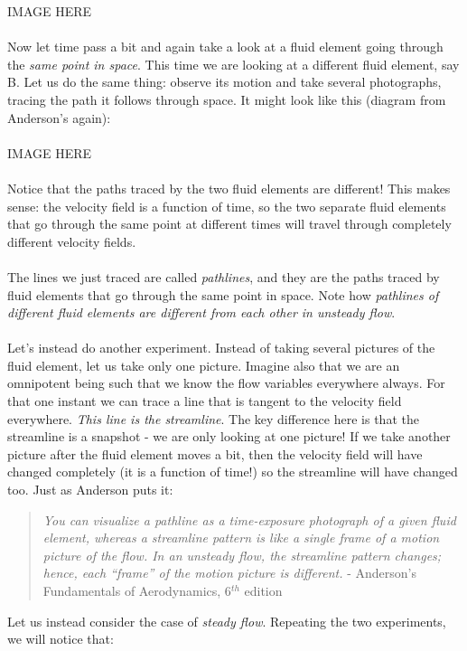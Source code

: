 \documentclass[11pt]{article}
\begin{document}
IMAGE HERE \\ \\ 
\noindent
Now let time pass a bit and again take a look at a fluid element going through the \emph{same point in space}. This time we are looking at a different fluid element, say B. Let us do the same thing: observe its motion and take several photographs, tracing the path it follows through space. It might look like this (diagram from Anderson's again): \\ \\

IMAGE HERE \\ \\
\noindent
Notice that the paths traced by the two fluid elements are different! This makes sense: the velocity field is a function of time, so the two separate fluid elements that go through the same point at different times will travel through completely different velocity fields. \\ \\
\noindent
The lines we just traced are called \emph{pathlines}, and they are the paths traced by fluid elements that go through the same point in space. Note how \emph{pathlines of different fluid elements are different from each other in unsteady flow}.\\ \\
\noindent
Let's instead do another experiment. Instead of taking several pictures of the fluid element, let us take only one picture. Imagine also that we are an omnipotent being such that we know the flow variables everywhere always. For that one instant we can trace a line that is tangent to the velocity field everywhere. \emph{This line is the streamline}. The key difference here is that the streamline is a snapshot - we are only looking at one picture! If we take another picture after the fluid element moves a bit, then the velocity field will have changed completely (it is a function of time!) so the streamline will have changed too. Just as Anderson puts it:

\begin{quote}
    \emph{You can visualize a pathline as a time-exposure photograph of a given fluid element, whereas a streamline pattern is like a single frame of a motion picture of the flow. In an unsteady flow, the streamline pattern changes; hence, each “frame” of the motion picture is different.} - Anderson's Fundamentals of Aerodynamics, 6$^{th}$ edition
\end{quote}
\noindent
Let us instead consider the case of \emph{steady flow}. Repeating the two experiments, we will notice that:
\end{document}
